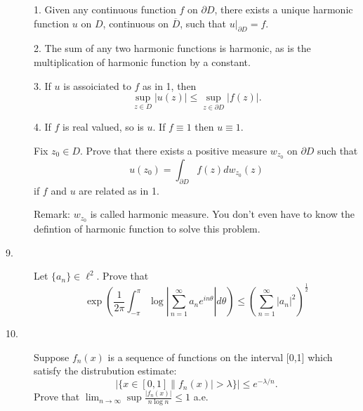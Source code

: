 \documentclass{article}
\begin{document}
\begin{description}
\item[\quad] 1.
Given any continuous function $f$ on $\partial D$, there exists a unique
harmonic function $u$ on $D$, continuous on $\overline D$, such that
$u|_{\partial D} = f$.

\item[\quad] 2.
The sum of any two harmonic functions is harmonic, as is the multiplication
of harmonic function by a constant.

\item[\quad] 3.
If $u$ is assoiciated to $f$ as in 1, then
$$\sup_{z \in D} |u(z)| \leq \sup_{z \in \partial D} |f(z)|.$$

\item[\quad] 4.
If $f$ is real valued, so is $u$. If $f \equiv 1$ then $u \equiv 1$.

Fix $z_0 \in D$. Prove that there exists a positive measure $w_{z_0}$ on
$\partial D$ such that
$$u(z_0) = \int_{\partial D} f(z) dw_{z_0} (z)$$
if $f$ and $u$ are related as in 1.

Remark: $w_{z_0}$ is called harmonic measure. You don't even have to know the
defintion of harmonic function to solve this problem.

\item[9.]
Let $\{a_n\} \in \ell^2$. Prove that
$$\exp \left(\frac{1}{2 \pi} \int^\pi_{-\pi} \log \left| \sum^\infty_{n=1}
  a_n e^{in\theta} \right| d \theta \right) \leq
  \left(\sum^\infty_{n=1} |a_n|^2 \right)^{\frac{1}{2}}$$

\item[10.]
Suppose $f_n(x)$ is a sequence of functions on the interval [0,1] which
satisfy the distrubution estimate:
$$|\{x \in [0,1] \parallel f_n (x) | > \lambda \} | \leq e^{-\lambda / n}.$$
Prove that $\lim_{n \to \infty} \sup \frac{|f_n (x)|}{n \log n} \leq 1$
a.e.






\end{description}    
\end{document}
